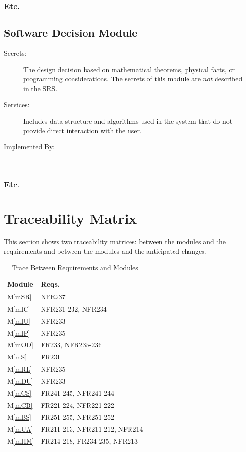 \documentclass[12pt, titlepage]{article}
\newcommand{\mref}[1]{M\ref{#1}}
\begin{document}
\subsubsection{Etc.}


\subsection{Software Decision Module}

\begin{description}
\item[Secrets:] The design decision based on mathematical theorems, physical
  facts, or programming considerations. The secrets of this module are
  \emph{not} described in the SRS.
\item[Services:] Includes data structure and algorithms used in the system that
  do not provide direct interaction with the user. 
\item[Implemented By:] --
\end{description}

\subsubsection{Etc.}

\section{Traceability Matrix} \label{SecTM}

This section shows two traceability matrices: between the modules and the
requirements and between the modules and the anticipated changes.

\begin{table}[H]
\centering
\begin{tabular}{p{} p{}}
\toprule
\textbf{Module} & \textbf{Reqs.}\\
\midrule
\mref{mSR} & NFR237\\
\mref{mIC} & NFR231-232, NFR234\\
\mref{mIU} & NFR233\\
\mref{mIP} & NFR235\\
\mref{mOD} & FR233, NFR235-236\\
\mref{mS} & FR231\\
\mref{mRL} & NFR235\\
\mref{mDU} & NFR233\\
\mref{mCS} & FR241-245, NFR241-244\\
\mref{mCB} & FR221-224, NFR221-222\\
\mref{mBS} & FR251-255, NFR251-252\\
\mref{mUA} & FR211-213, NFR211-212, NFR214 \\
\mref{mHM} & FR214-218, FR234-235, NFR213 \\

\bottomrule
\end{tabular}
\caption{Trace Between Requirements and Modules}
\label{TblRT}
\end{table}
\end{document}
